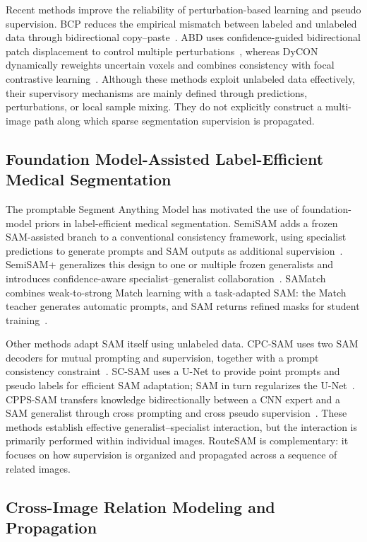 \documentclass[a4paper,fleqn]{cas-dc}
\begin{document}
Recent methods improve the reliability of perturbation-based learning and pseudo supervision. BCP reduces the empirical mismatch between labeled and unlabeled data through bidirectional copy--paste~\cite{bai2023bcp}. ABD uses confidence-guided bidirectional patch displacement to control multiple perturbations~\cite{chi2024abd}, whereas DyCON dynamically reweights uncertain voxels and combines consistency with focal contrastive learning~\cite{assefa2025dycon}. Although these methods exploit unlabeled data effectively, their supervisory mechanisms are mainly defined through predictions, perturbations, or local sample mixing. They do not explicitly construct a multi-image path along which sparse segmentation supervision is propagated.

\subsection{Foundation Model-Assisted Label-Efficient Medical Segmentation}

The promptable Segment Anything Model has motivated the use of foundation-model priors in label-efficient medical segmentation. SemiSAM adds a frozen SAM-assisted branch to a conventional consistency framework, using specialist predictions to generate prompts and SAM outputs as additional supervision~\cite{zhang2023semisam}. SemiSAM+ generalizes this design to one or multiple frozen generalists and introduces confidence-aware specialist--generalist collaboration~\cite{zhang2025semisamplus}. SAMatch combines weak-to-strong Match learning with a task-adapted SAM: the Match teacher generates automatic prompts, and SAM returns refined masks for student training~\cite{xu2024samatch}.

Other methods adapt SAM itself using unlabeled data. CPC-SAM uses two SAM decoders for mutual prompting and supervision, together with a prompt consistency constraint~\cite{miao2024cpcsam}. SC-SAM uses a U-Net to provide point prompts and pseudo labels for efficient SAM adaptation; SAM in turn regularizes the U-Net~\cite{vu2026scsam}. CPPS-SAM transfers knowledge bidirectionally between a CNN expert and a SAM generalist through cross prompting and cross pseudo supervision~\cite{zhang2026cppssam}. These methods establish effective generalist--specialist interaction, but the interaction is primarily performed within individual images. RouteSAM is complementary: it focuses on how supervision is organized and propagated across a sequence of related images.

\subsection{Cross-Image Relation Modeling and Propagation}
\end{document}
